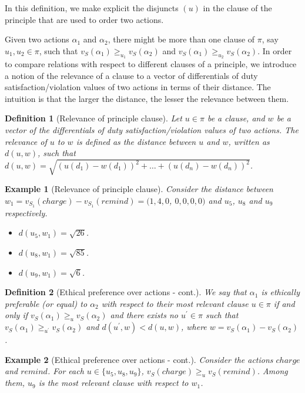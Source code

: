 \documentclass[letterpaper]{article} %
\newtheorem{definition}{Definition}
\newtheorem{example}{Example}
\begin{document}
In this definition, we make explicit the disjuncts $(u)$ in the clause of the principle that are used to order two actions. 

Given two actions $\alpha_1$ and $\alpha_2$, there might be more than one clause of $\pi$, say $u_1, u_2\in \pi$, such that $v_{S}(\alpha_1) \ge_{u_1} v_{S}(\alpha_2)$ and $v_{S}(\alpha_1) \ge_{u_2} v_{S}(\alpha_2)$. In order to compare relations with respect to different clauses of a principle, we introduce a notion of the relevance of a clause to a vector of differentials of duty satisfaction/violation values of two actions in terms of their distance. The intuition is that the larger the distance, the lesser the relevance between them. 

\begin{definition}[Relevance of principle clause]
Let $u\in \pi$ be a clause, and $w$ be a vector of the differentials of duty satisfaction/violation values of two actions. The relevance of $u$ to $w$ is defined as the distance between $u$ and $w$, written as $d(u, w)$, such that $d(u, w) = \sqrt{(u(d_1)-w(d_1))^2+\dots+(u(d_n)-w(d_n))^2}$. 
\end{definition}

\begin{example}[Relevance of principle clause]
Consider the distance between $w_1 = v_{S_1}(charge)-v_{S_1}(remind) = (1, 4, 0$, $0, 0, 0, 0)$ and $u_5$, $u_8$ and $u_9$ respectively. 
\begin{itemize}
    \item $d(u_5, w_1) = \sqrt{26}$.
    \item $d(u_8, w_1) = \sqrt{85}$.
    \item $d(u_9, w_1) = \sqrt{6}$.
\end{itemize}
\end{example}

\begin{definition}[Ethical preference over actions - cont.]
We say that $\alpha_1$ is ethically preferable (or
equal) to $\alpha_2$ with respect to their most relevant clause $u\in \pi$ if and only if $v_{S}(\alpha_1) \ge_u v_{S}(\alpha_2)$ and there exists no $u^\prime\in \pi$ such that $v_{S}(\alpha_1) \ge_{u^\prime} v_{S}(\alpha_2)$ and $d(u^\prime, w) < d(u, w)$, where $w = v_{S}(\alpha_1) - v_{S}(\alpha_2)$.
\end{definition}

\begin{example}[Ethical preference over actions - cont.]
Consider the actions $charge$ and $remind$. For each $u\in\{u_5,u_8,u_9\}$, $v_{S}(charge) \ge_u v_{S}(remind)$. Among them, $u_9$ is the most relevant clause with respect to $w_1$. 
\end{example}
\end{document}
